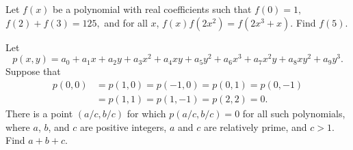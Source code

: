 \documentclass[11pt]{article}
\theoremstyle{definition}
\begin{document}
%	
















\begin{question}[name={2007 AIME II, \href{https://artofproblemsolving.com/community/c4p798241}{Problem 14}}]
	Let $f(x)$ be a polynomial with real coefficients such that $f(0) = 1,$ $f(2)+f(3)=125,$ and for all $x$, $f(x)f(2x^{2})=f(2x^{3}+x).$ Find $f(5)$.
\end{question}


%	







\begin{question}[name={2008 AIME I, \href{https://artofproblemsolving.com/community/c4p1075365}{Problem 13}}]
	Let
	\[ p(x,y) = a_0 + a_1x + a_2y + a_3x^2 + a_4xy + a_5y^2 + a_6x^3 + a_7x^2y + a_8xy^2 + a_9y^3.
	\]Suppose that
	\begin{align*}p(0,0) &= p(1,0) = p( - 1,0) = p(0,1) = p(0, - 1) \\&= p(1,1) = p(1, - 1) = p(2,2) = 0.\end{align*}There is a point $ \left( {a}/{c}, {b}/{c}\right)$ for which $ p\left( {a}/{c}, {b}/{c}\right) = 0$ for all such polynomials, where $ a$, $ b$, and $ c$ are positive integers, $ a$ and $ c$ are relatively prime, and $ c > 1$. Find $ a + b + c$.
\end{question}
\end{document}
